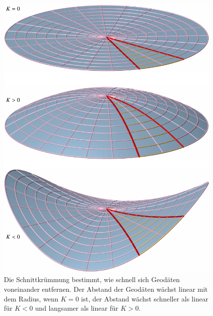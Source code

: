%
%
%
\begin{figure}
\centering
\includegraphics{chapters/110-kruemmung/images/kruemmung.pdf}
\caption{Die Schnittkrümmung bestimmt, wie schnell sich Geodäten
voneinander entfernen.
Der Abstand der Geodäten wächst linear mit dem Radius, wenn 
$K=0$ ist, der Abstand wächst schneller als linear für $K<0$ und
langsamer als linear für $K>0$.
\label{buch:kruemmung:fig:schnittkruemung}}
\end{figure}
